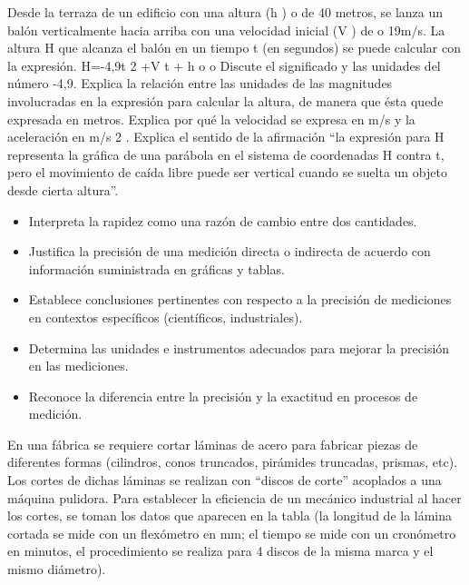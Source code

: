 \ejemplo

Desde la terraza de un edificio con una altura (h ) o de 40 metros, se lanza un balón verticalmente hacia arriba con una velocidad inicial (V ) de o 19m/s. La altura H que alcanza el balón en un tiempo t (en segundos) se puede calcular con la expresión. H=-4,9t 2 +V t + h o o Discute el significado y las unidades del número -4,9. Explica la relación entre las unidades de las magnitudes involucradas en la expresión para calcular la altura, de manera que ésta quede expresada en metros. Explica por qué la velocidad se expresa en m/s y la aceleración en m/s 2 . Explica el sentido de la afirmación “la expresión para H representa la gráfica de una parábola en el sistema de coordenadas H contra t, pero el movimiento de caída libre puede ser vertical cuando se suelta un objeto desde cierta altura”.


\evidencias

\begin{itemize}
  \item Interpreta la rapidez como una razón de cambio entre dos cantidades.
  \item Justifica la precisión de una medición directa o indirecta de acuerdo con información suministrada en gráficas y tablas.
  \item Establece conclusiones pertinentes con respecto a la precisión de mediciones en contextos específicos (científicos, industriales).
  \item Determina las unidades e instrumentos adecuados para mejorar la precisión en las mediciones.
  \item Reconoce la diferencia entre la precisión y la exactitud en procesos de medición.
\end{itemize}

\ejemplo

En una fábrica se requiere cortar láminas de acero para fabricar piezas de diferentes formas (cilindros, conos truncados, pirámides truncadas, prismas, etc). Los cortes de dichas láminas se realizan con “discos de corte” acoplados a una máquina pulidora. Para establecer la eficiencia de un mecánico industrial al hacer los cortes, se toman los datos que aparecen en la tabla (la longitud de la lámina cortada se mide con un flexómetro en mm; el tiempo se mide con un cronómetro en minutos, el procedimiento se realiza para 4 discos de la misma marca y el mismo diámetro).

